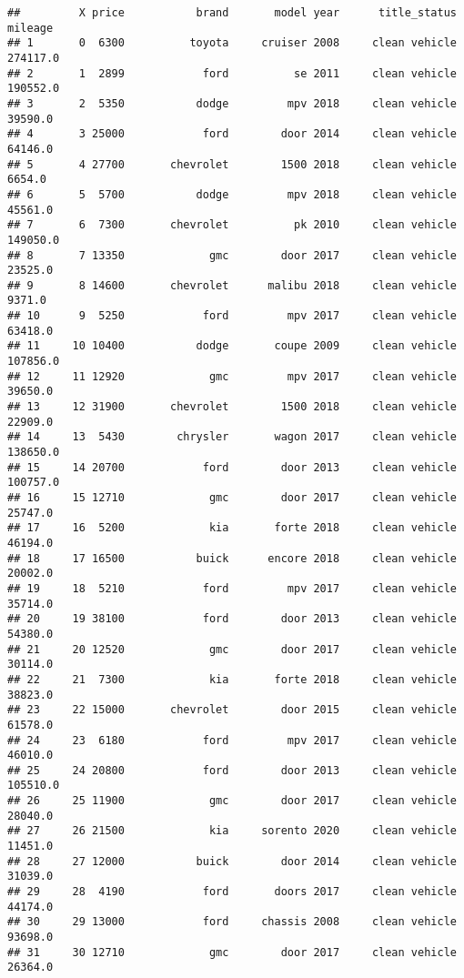 \documentclass[
]{article}
\begin{document}
\begin{verbatim}
##         X price           brand       model year      title_status   mileage
## 1       0  6300          toyota     cruiser 2008     clean vehicle  274117.0
## 2       1  2899            ford          se 2011     clean vehicle  190552.0
## 3       2  5350           dodge         mpv 2018     clean vehicle   39590.0
## 4       3 25000            ford        door 2014     clean vehicle   64146.0
## 5       4 27700       chevrolet        1500 2018     clean vehicle    6654.0
## 6       5  5700           dodge         mpv 2018     clean vehicle   45561.0
## 7       6  7300       chevrolet          pk 2010     clean vehicle  149050.0
## 8       7 13350             gmc        door 2017     clean vehicle   23525.0
## 9       8 14600       chevrolet      malibu 2018     clean vehicle    9371.0
## 10      9  5250            ford         mpv 2017     clean vehicle   63418.0
## 11     10 10400           dodge       coupe 2009     clean vehicle  107856.0
## 12     11 12920             gmc         mpv 2017     clean vehicle   39650.0
## 13     12 31900       chevrolet        1500 2018     clean vehicle   22909.0
## 14     13  5430        chrysler       wagon 2017     clean vehicle  138650.0
## 15     14 20700            ford        door 2013     clean vehicle  100757.0
## 16     15 12710             gmc        door 2017     clean vehicle   25747.0
## 17     16  5200             kia       forte 2018     clean vehicle   46194.0
## 18     17 16500           buick      encore 2018     clean vehicle   20002.0
## 19     18  5210            ford         mpv 2017     clean vehicle   35714.0
## 20     19 38100            ford        door 2013     clean vehicle   54380.0
## 21     20 12520             gmc        door 2017     clean vehicle   30114.0
## 22     21  7300             kia       forte 2018     clean vehicle   38823.0
## 23     22 15000       chevrolet        door 2015     clean vehicle   61578.0
## 24     23  6180            ford         mpv 2017     clean vehicle   46010.0
## 25     24 20800            ford        door 2013     clean vehicle  105510.0
## 26     25 11900             gmc        door 2017     clean vehicle   28040.0
## 27     26 21500             kia     sorento 2020     clean vehicle   11451.0
## 28     27 12000           buick        door 2014     clean vehicle   31039.0
## 29     28  4190            ford       doors 2017     clean vehicle   44174.0
## 30     29 13000            ford     chassis 2008     clean vehicle   93698.0
## 31     30 12710             gmc        door 2017     clean vehicle   26364.0

\end{verbatim}
\end{document}
